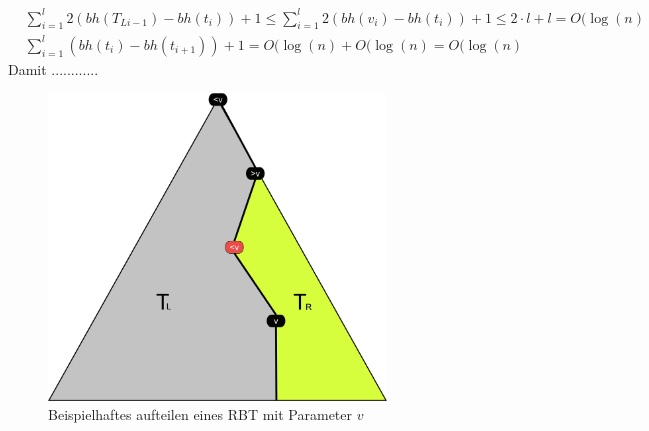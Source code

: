 \documentclass[a4paper,12pt]{article}
\begin{document}
 
\begin{align*}
&\sum_{i = 1}^{l}  2 (\mathit{bh}(T_{Li-1}) -\mathit{bh}(t_{i})) + 1 \leq \sum_{i = 1}^{l}  2 (\mathit{bh}(v_i) -\mathit{bh}(t_{i})) + 1 \leq  2 \cdot l + l = O(\log(n)\\
&\sum_{i = 1}^{l}  (\mathit{bh}(t_i) -\mathit{bh}(t_{i+1})) + 1 = O(\log(n) +  O(\log(n) =  O(\log(n)
\end{align*}
Damit ............
\begin{figure}[h]
	\centering
	\includegraphics[width=0.8\textwidth]{"Medien/RotSchwarzBaum/aufteilen"}
	\caption{Beispielhaftes aufteilen eines RBT mit Parameter $v$ }
	\label{fig:aufteilen}
\end{figure}

\newpage


\end{document}
